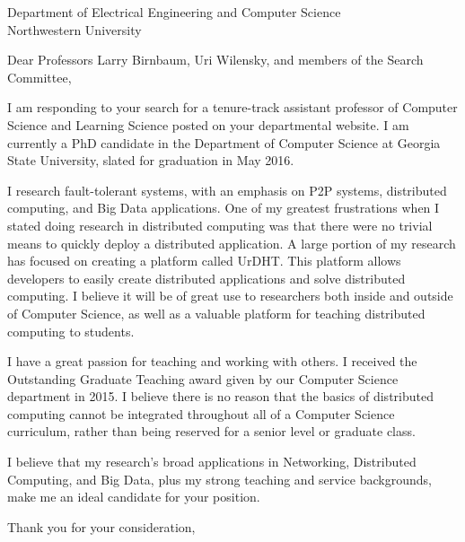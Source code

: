 \documentclass[12pt]{letter}
\date{}
\begin{document}
 
\begin{letter}{Department of Electrical Engineering and Computer Science \\ Northwestern University} 
\opening{Dear Professors Larry Birnbaum, Uri Wilensky, and members of the Search Committee,} 
 
I am responding to your search for a tenure-track assistant professor of Computer Science and Learning Science posted on your departmental website.
I am currently a PhD candidate in the Department of Computer Science at Georgia State University, slated for graduation in May 2016.

I research fault-tolerant systems, with an emphasis on P2P systems, distributed computing, and Big Data applications.
One of my greatest frustrations when I stated doing research in distributed computing was that there were no trivial means to quickly deploy a distributed application.
A large portion of my research has focused on creating a platform called UrDHT.
This platform allows developers to easily create distributed applications and solve distributed computing.
I believe it will be of great use to researchers both inside and outside of Computer Science, as well as a valuable platform for teaching distributed computing to students.



I have a great passion for teaching and working with others.
I received the Outstanding Graduate Teaching award given by our Computer Science department in 2015.
I believe there is no reason that the basics of distributed computing cannot be integrated throughout all of a Computer Science curriculum, rather than being  reserved for a senior level or graduate class.

I believe that my research's broad applications in Networking, Distributed Computing, and Big Data, plus my strong teaching and service backgrounds, make me an ideal candidate for your position.


\closing{Thank you for your consideration,} 
\end{letter} 
\end{document}
